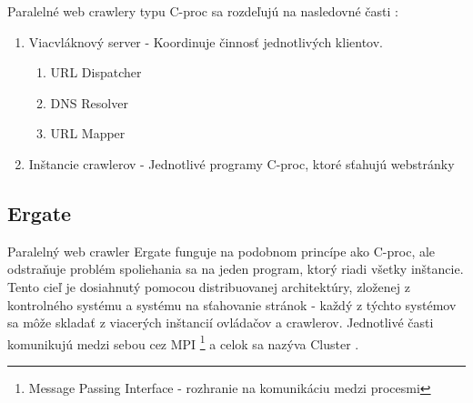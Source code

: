 \documentclass[10pt,twoside,slovak,a4paper]{article}
\begin{document}
Paralelné web crawlery typu C-proc sa rozdeľujú na nasledovné časti \cite{9645918, sharma2011novel}:

\begin{enumerate}
    \item Viacvláknový server - Koordinuje činnosť jednotlivých klientov.
        \begin{enumerate}
            \item URL Dispatcher
            \item DNS Resolver
            \item URL Mapper
        \end{enumerate}
        \item Inštancie crawlerov - Jednotlivé programy C-proc, ktoré sťahujú webstránky
\end{enumerate}

\subsection{Ergate}

Paralelný web crawler Ergate funguje na podobnom princípe ako C-proc, ale odstraňuje problém spoliehania sa na jeden program, ktorý riadi všetky inštancie. Tento cieľ je dosiahnutý pomocou distribuovanej architektúry, zloženej z kontrolného systému a systému na sťahovanie stránok - každý z týchto systémov sa môže skladať z viacerých inštancií ovládačov a crawlerov. Jednotlivé časti komunikujú medzi sebou cez MPI \footnote{Message Passing Interface - rozhranie na komunikáciu medzi procesmi} a celok sa nazýva Cluster \cite{5709184}.

\newpage



\end{document}
